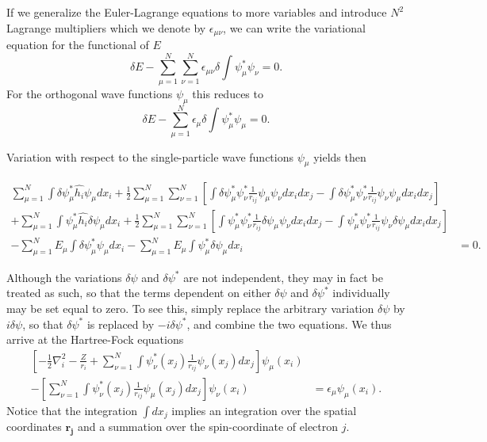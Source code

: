 If we generalize the Euler-Lagrange equations to more variables 
and introduce $N^2$ Lagrange multipliers which we denote by 
$\epsilon_{\mu\nu}$, we can write the variational equation for the functional of $E$
\[
  \delta E - \sum_{{\mu}=1}^N\sum_{{\nu}=1}^N \epsilon_{\mu\nu} \delta
  \int \psi_{\mu}^* \psi_{\nu} = 0.
\]
For the orthogonal wave functions $\psi_{\mu}$ this reduces to
\[
  \delta E - \sum_{{\mu}=1}^N \epsilon_{\mu} \delta
  \int \psi_{\mu}^* \psi_{\mu} = 0.
\]

Variation with respect to the single-particle wave functions $\psi_{\mu}$ yields then

\begin{equation*}
\begin{split}
  \sum_{\mu=1}^N \int \delta\psi_{\mu}^*\hat{h_i}\psi_{\mu}
  dx_i  
  + \frac{1}{2}\sum_{{\mu}=1}^N\sum_{{\nu}=1}^N \left[ \int
  \delta\psi_{\mu}^*\psi_{\nu}^*\frac{1} 
  {r_{ij}}\psi_{\mu}\psi_{\nu} dx_idx_j- \int
  \delta\psi_{\mu}^*\psi_{\nu}^*\frac{1}{r_{ij}}\psi_{\nu}\psi_{\mu}
  dx_idx_j \right] & \\
  + \sum_{\mu=1}^N \int \psi_{\mu}^*\hat{h_i}\delta\psi_{\mu}
  dx_i 
  + \frac{1}{2}\sum_{{\mu}=1}^N\sum_{{\nu}=1}^N \left[ \int
  \psi_{\mu}^*\psi_{\nu}^*\frac{1} 
  {r_{ij}}\delta\psi_{\mu}\psi_{\nu} dx_idx_j- \int
  \psi_{\mu}^*\psi_{\nu}^*\frac{1}{r_{ij}}\psi_{\nu}\delta\psi_{\mu}
  dx_idx_j \right] & \\
  -  \sum_{{\mu}=1}^N E_{\mu} \int \delta\psi_{\mu}^*
  \psi_{\mu}dx_i
  -  \sum_{{\mu}=1}^N E_{\mu} \int \psi_{\mu}^*
  \delta\psi_{\mu}dx_i & = 0.
\end{split}
\end{equation*}


Although the variations $\delta\psi$ and $\delta\psi^*$ are not
independent, they may in fact be treated as such, so that the 
terms dependent on either $\delta\psi$ and $\delta\psi^*$ individually 
may be set equal to zero. To see this, simply 
replace the arbitrary variation $\delta\psi$ by $i\delta\psi$, so that
$\delta\psi^*$ is replaced by $-i\delta\psi^*$, and combine the two
equations. We thus arrive at the Hartree-Fock equations
\[
  \begin{split}
    \left[ -\frac{1}{2}\nabla_i^2-\frac{Z}{r_i} + \sum_{{\nu}=1}^N
      \int \psi_{\nu}^*(x_j)\frac{1}{r_{ij}}
      \psi_{\nu}(x_j)dx_j \right]
    \psi_{\mu}(x_i)  & \\
    - \left[ \sum_{{\nu}=1}^N \int
      \psi_{\nu}^*(x_j) 
      \frac{1}{r_{ij}}\psi_{\mu}(x_j) dx_j
      \right] \psi_{\nu}(x_i)  & 
  = \epsilon_{\mu} \psi_{\mu}(x_i).
  \end{split}
\]
Notice that the integration $\int dx_j$ implies an
integration over the spatial coordinates $\mathbf{r_j}$ and a summation
over the spin-coordinate of electron $j$.

